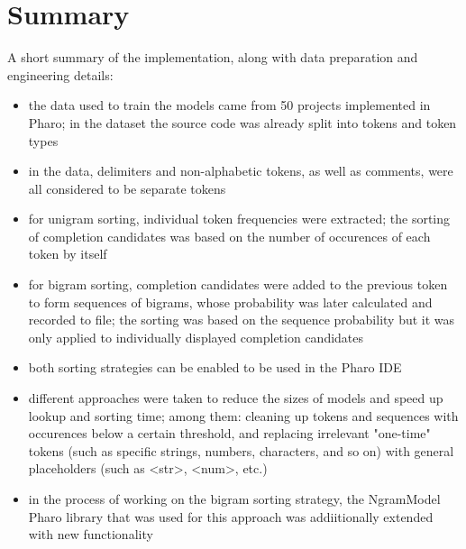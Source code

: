 \section{Summary}
\label{sec:ProposedSolution-Summary}
A short summary of the implementation, along with data preparation and engineering details:
\begin{itemize}
    \item the data used to train the models came from 50 projects implemented in Pharo; in the dataset the source code was already split into tokens and token types
    \item in the data, delimiters and non-alphabetic tokens, as well as comments, were all considered to be separate tokens
    \item for unigram sorting, individual token frequencies were extracted; the sorting of completion candidates was based on the number of occurences of each token by itself
    \item for bigram sorting, completion candidates were added to the previous token to form sequences of bigrams, whose probability was later calculated and recorded to file; the sorting was based on the sequence probability but it was only applied to individually displayed completion candidates
    \item both sorting strategies can be enabled to be used in the Pharo IDE
    \item different approaches were taken to reduce the sizes of models and speed up lookup and sorting time; among them: cleaning up tokens and sequences with occurences below a certain threshold, and replacing irrelevant "one-time" tokens (such as specific strings, numbers, characters, and so on) with general placeholders (such as <str>, <num>, etc.)
    \item in the process of working on the bigram sorting strategy, the NgramModel Pharo library that was used for this approach was addiitionally extended with new functionality
\end{itemize}